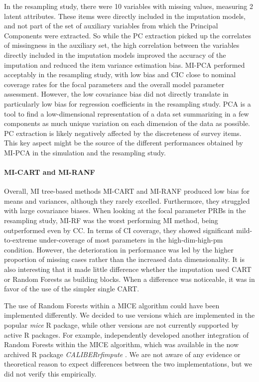 	In the resampling study, there were 10 variables with missing values, measuring 2 latent attributes.
	These items were directly included in the imputation models, and not part of the set of auxiliary variables from which
	the Principal Components were extracted.
	So while the PC extraction picked up the correlates of missingness in the auxiliary set, the high correlation
	between the variables directly included in the imputation models improved the accuracy of the imputation and
	reduced the item variance estimation bias.
	MI-PCA performed acceptably in the resampling study, with low bias and CIC close to nominal coverage rates
	for the focal parameters and the overall model parameter assessment.
	However, the low covariance bias did not directly translate in particularly low bias for regression 
	coefficients in the resampling study.
	PCA is a tool to find a low-dimensional representation of a data set summarizing in a few components as much 
	unique variation on each dimension of the data as possible.
	PC extraction is likely negatively affected by the discreteness of survey items.
	This key aspect might be the source of the different performances obtained by MI-PCA in the simulation and the 
	resampling study.

\paragraph{MI-CART and MI-RANF}
	Overall, MI tree-based methods MI-CART and MI-RANF produced low bias for means and variances, although they 
	rarely excelled.
	Furthermore, they struggled with large covariance biases.
	When looking at the focal parameter PRBs in the resampling study, MI-RF was the worst performing MI method, 
	being outperformed even by CC.
	In terms of CI coverage, they showed significant mild-to-extreme under-coverage of most parameters in 
	the high-dim-high-pm condition.
	However, the deterioration in performance was led by the higher proportion of missing cases rather than 
	the increased data dimensionality.
	It is also interesting that it made little difference whether the imputation used CART or Random Forests 
	as building blocks. 
	When a difference was noticeable, it was in favor of the use of the simpler single CART.
	
	The use of Random Forests within a MICE algorithm could have been implemented differently.
	We decided to use \cite{dooveEtAl:2014} versions which are implemented in the popular 
	\emph{mice} R package, while other versions are not currently supported by active R packages.
	For example, \cite{shahEtAl:2014} independently developed another integration of Random Forests
	within the MICE algorithm, which was available in the now archived R package \emph{CALIBERrfimpute}
	\citep{CALIBERrfimpute}.
	We are not aware of any evidence or theoretical reason to expect differences between the two implementations, 
	but we did not verify this empirically.

